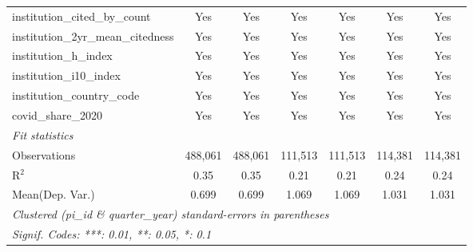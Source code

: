 \begin{tabular}{lcccccc}
   institution\_cited\_by\_count                               & Yes            & Yes            & Yes           & Yes           & Yes           & Yes\\  
   institution\_2yr\_mean\_citedness                           & Yes            & Yes            & Yes           & Yes           & Yes           & Yes\\  
   institution\_h\_index                                       & Yes            & Yes            & Yes           & Yes           & Yes           & Yes\\  
   institution\_i10\_index                                     & Yes            & Yes            & Yes           & Yes           & Yes           & Yes\\  
   institution\_country\_code                                  & Yes            & Yes            & Yes           & Yes           & Yes           & Yes\\  
   covid\_share\_2020                                          & Yes            & Yes            & Yes           & Yes           & Yes           & Yes\\  
   \midrule
   \emph{Fit statistics}\\
   Observations                                                & 488,061        & 488,061        & 111,513       & 111,513       & 114,381       & 114,381\\  
   R$^2$                                                       & 0.35           & 0.35           & 0.21          & 0.21          & 0.24          & 0.24\\  
Mean(Dep. Var.) & 0.699 & 0.699 & 1.069 & 1.069 & 1.031 & 1.031 \\
   \midrule \midrule
   \multicolumn{7}{l}{\emph{Clustered (pi\_id \& quarter\_year) standard-errors in parentheses}}\\
   \multicolumn{7}{l}{\emph{Signif. Codes: ***: 0.01, **: 0.05, *: 0.1}}\\
\end{tabular}
\par\endgroup
